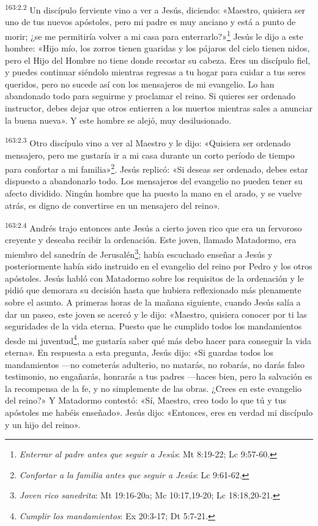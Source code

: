\par 
\textsuperscript{163:2.2} Un discípulo ferviente vino a ver a Jesús, diciendo: «Maestro, quisiera ser uno de tus nuevos apóstoles, pero mi padre es muy anciano y está a punto de morir; ¿se me permitiría volver a mi casa para enterrarlo?»\footnote{\textit{Enterrar al padre antes que seguir a Jesús}: Mt 8:19-22; Lc 9:57-60.} Jesús le dijo a este hombre: «Hijo mío, los zorros tienen guaridas y los pájaros del cielo tienen nidos, pero el Hijo del Hombre no tiene donde recostar su cabeza. Eres un discípulo fiel, y puedes continuar siéndolo mientras regresas a tu hogar para cuidar a tus seres queridos, pero no sucede así con los mensajeros de mi evangelio. Lo han abandonado todo para seguirme y proclamar el reino. Si quieres ser ordenado instructor, debes dejar que otros entierren a los muertos mientras sales a anunciar la buena nueva». Y este hombre se alejó, muy desilusionado.

\par 
\textsuperscript{163:2.3} Otro discípulo vino a ver al Maestro y le dijo: «Quisiera ser ordenado mensajero, pero me gustaría ir a mi casa durante un corto período de tiempo para confortar a mi familia»\footnote{\textit{Confortar a la familia antes que seguir a Jesús}: Lc 9:61-62.}. Jesús replicó: «Si deseas ser ordenado, debes estar dispuesto a abandonarlo todo. Los mensajeros del evangelio no pueden tener su afecto dividido. Ningún hombre que ha puesto la mano en el arado, y se vuelve atrás, es digno de convertirse en un mensajero del reino».

\par 
\textsuperscript{163:2.4} Andrés trajo entonces ante Jesús a cierto joven rico que era un fervoroso creyente y deseaba recibir la ordenación. Este joven, llamado Matadormo, era miembro del sanedrín de Jerusalén\footnote{\textit{Joven rico sanedrita}: Mt 19:16-20a; Mc 10:17,19-20; Lc 18:18,20-21.}; había escuchado enseñar a Jesús y posteriormente había sido instruido en el evangelio del reino por Pedro y los otros apóstoles. Jesús habló con Matadormo sobre los requisitos de la ordenación y le pidió que demorara su decisión hasta que hubiera reflexionado más plenamente sobre el asunto. A primeras horas de la mañana siguiente, cuando Jesús salía a dar un paseo, este joven se acercó y le dijo: «Maestro, quisiera conocer por ti las seguridades de la vida eterna. Puesto que he cumplido todos los mandamientos desde mi juventud\footnote{\textit{Cumplir los mandamientos}: Ex 20:3-17; Dt 5:7-21.}, me gustaría saber qué más debo hacer para conseguir la vida eterna». En respuesta a esta pregunta, Jesús dijo: «Si guardas todos los mandamientos ---no cometerás adulterio, no matarás, no robarás, no darás falso testimonio, no engañarás, honrarás a tus padres ---haces bien, pero la salvación es la recompensa de la fe, y no simplemente de las obras. ¿Crees en este evangelio del reino?» Y Matadormo contestó: «Sí, Maestro, creo todo lo que tú y tus apóstoles me habéis enseñado». Jesús dijo: «Entonces, eres en verdad mi discípulo y un hijo del reino».

